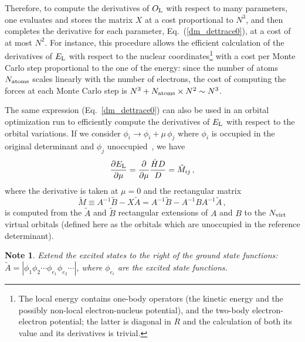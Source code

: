 \documentclass[aip,jcp,reprint,floatfix,onecolumn]{revtex4-1}
\newtheorem*{note}{Note}
\def\wdet{D}
\begin{document}
Therefore, to compute the derivatives of $O_{\rm L}$ with respect to many parameters,
one evaluates and stores the matrix $X$ at a cost
proportional to $N^3$, and then completes the derivative for each parameter,
Eq.~(\ref{dm_dettrace0}), at a cost of at most $N^2$. For instance, this procedure allows the efficient
calculation of the derivatives of $E_{\rm L}$ with respect to the nuclear coordinates\footnote{The local energy contains one-body operators (the kinetic energy
and the possibly non-local electron-nucleus potential), and
the two-body electron-electron potential; the latter is
diagonal in $R$ and the calculation of both its value and
its derivatives is trivial.} with a cost per Monte Carlo step proportional to the one of the energy:  since the number of
atoms $N_{\rm atoms}$ scales linearly with the number of electrons, the cost of computing the forces at each Monte Carlo step is
$N^3+N_{\rm atoms}\times N^2\sim N^3$.

The same expression (Eq.~\ref{dm_dettrace0}) can also be used in an orbital optimization run to  efficiently compute the derivatives of $E_{\rm L}$ with
respect to the orbital variations. If we consider $\phi_i\to\phi_i+\mu\,\phi_j$ where $\phi_i$ is occupied in the original determinant and $\phi_j$ unoccupied~\cite{opt_orb},  we have
\begin{equation}
\frac{\partial E_{\rm L}}{\partial \mu}  = \frac{\partial}{\partial \mu} \frac{\hat{H}\wdet}{\wdet} = \tilde{M}_{ij}\,,
\label{devmono}
\end{equation}
where the derivative is taken at $\mu = 0$ and the rectangular matrix
\begin{equation}
\tilde{M} \equiv A^{-1} \tilde{B} -X \tilde{A} = A^{-1} \tilde{B} -A^{-1}BA^{-1} \tilde{A} \,,
\label{deftildeM}
\end{equation}
is computed from the $\tilde{A}$ and $\tilde{B}$ rectangular extensions of $A$ and $B$ to the $N_{\rm virt}$ virtual orbitals (defined here as the orbitals which are unoccupied in the reference determinant).

\begin{note}
Extend the excited states to the right of the ground state functions: $\widetilde{A} = |\phi_1\phi_2\cdots\phi_{e_1}\phi_{e_2}\cdots|$, where $\phi_{e_i}$ are the excited state functions.
\end{note}
\end{document}
